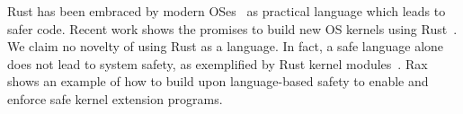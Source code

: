 







 Rust has been embraced
    by modern OSes~\cite{rust-for-linux-doc,rust-for-windows} as
    practical language which leads to safer code.
Recent work shows the promises to build new OS kernels using Rust~\cite{redleaf,theseus,tockos,Burtsev-hotos23}.
We claim no novelty of using Rust as a language.
In fact, a safe language alone does not lead to system safety,
    as exemplified by Rust kernel modules~\cite{rust-module-dev-quit-lwn}.
Rax shows an example of how to build upon language-based safety
    to enable and enforce safe kernel extension programs.



